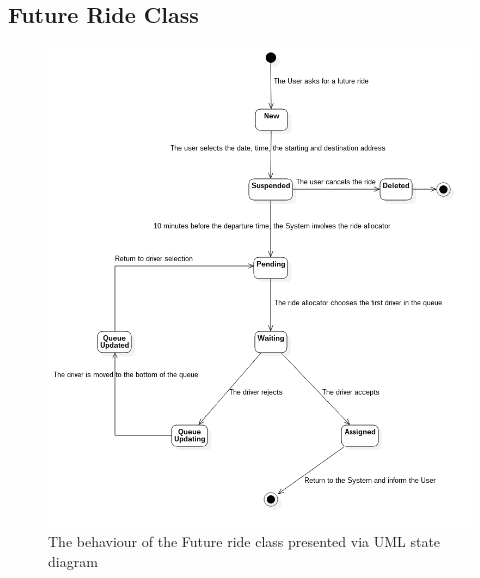\clearpage
\subsection{Future Ride Class}
\begin{figure}[h!]
	\centerline{\includegraphics[width=\textwidth]{./figures/Statechart_FutureRideClass.png}}
	\caption{The behaviour of the Future ride class presented via UML state diagram}
\end{figure}

\acresetall